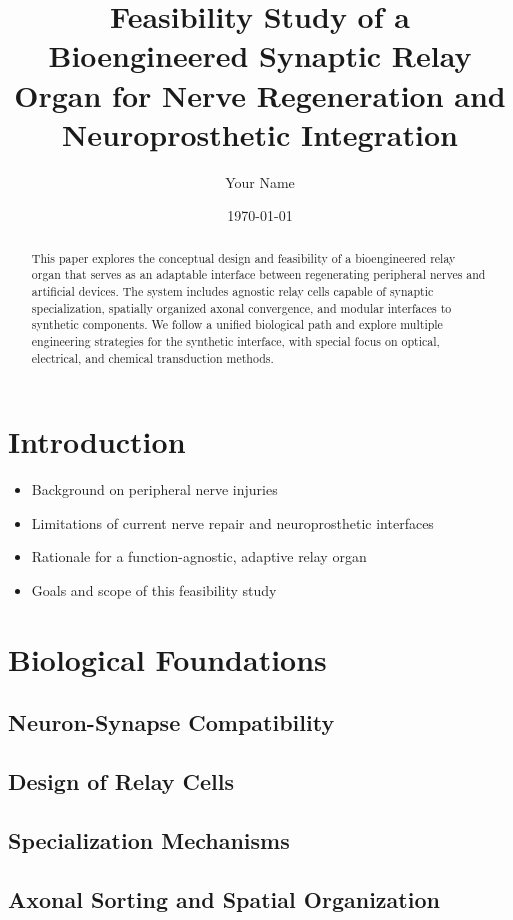 \documentclass[12pt]{article}
\title{Feasibility Study of a Bioengineered Synaptic Relay Organ for Nerve Regeneration and Neuroprosthetic Integration}
\author{Your Name}
\date{\today}
\begin{document}
	
	\maketitle
	
	\begin{abstract}
		This paper explores the conceptual design and feasibility of a bioengineered relay organ that serves as an adaptable interface between regenerating peripheral nerves and artificial devices. The system includes agnostic relay cells capable of synaptic specialization, spatially organized axonal convergence, and modular interfaces to synthetic components. We follow a unified biological path and explore multiple engineering strategies for the synthetic interface, with special focus on optical, electrical, and chemical transduction methods.
	\end{abstract}
	
	\tableofcontents
	
	\section{Introduction}
	\begin{itemize}
		\item Background on peripheral nerve injuries
		\item Limitations of current nerve repair and neuroprosthetic interfaces
		\item Rationale for a function-agnostic, adaptive relay organ
		\item Goals and scope of this feasibility study
	\end{itemize}
	
	\section{Biological Foundations}
	\subsection{Neuron-Synapse Compatibility}
	\subsection{Design of Relay Cells}
	\subsection{Specialization Mechanisms}
	\subsection{Axonal Sorting and Spatial Organization}
	
\end{document}
